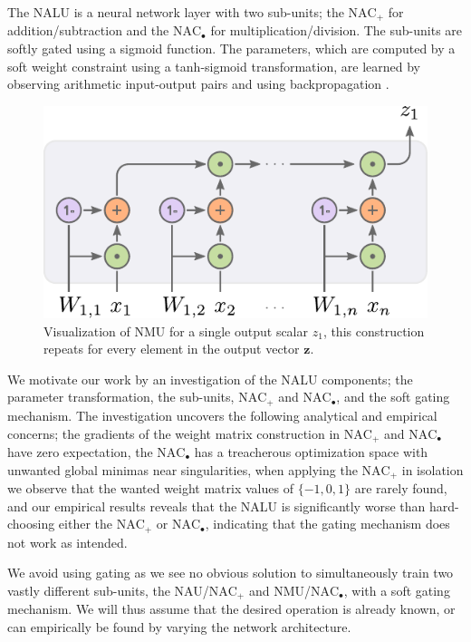 The NALU is a neural network layer with two sub-units; the $\text{NAC}_{+}$ for addition/subtraction and the $\text{NAC}_{\bullet}$ for multiplication/division.
The sub-units are softly gated using a sigmoid function. The parameters, which are computed by a soft weight constraint using a tanh-sigmoid transformation, are learned by observing arithmetic input-output pairs and using backpropagation \cite{rumelhart1986learning}.
\begin{figure}[h]
\centering
\includegraphics[scale=0.6]{graphics/nmu.pdf}
\caption{Visualization of NMU for a single output scalar $z_1$, this construction repeats for every element in the output vector $\mathbf{z}$.}
\end{figure}
We motivate our work by an investigation of the NALU components; the parameter transformation, the sub-units, $\text{NAC}_{+}$ and $\text{NAC}_{\bullet}$, and the soft gating mechanism.
The investigation uncovers the following analytical and empirical concerns; the gradients of the weight matrix construction in $\text{NAC}_{+}$ and $\text{NAC}_{\bullet}$ have zero expectation, the $\text{NAC}_{\bullet}$ has a treacherous optimization space with unwanted global minimas near singularities, when applying the $\text{NAC}_{+}$ in isolation we observe that the wanted weight matrix values of $\{-1, 0, 1\}$ are rarely found, and our empirical results reveals that the NALU is significantly worse than hard-choosing either the $\text{NAC}_{+}$ or $\text{NAC}_{\bullet}$, indicating that the gating mechanism does not work as intended.

We avoid using gating as we see no obvious solution to simultaneously train two vastly different sub-units, the NAU/$\text{NAC}_{+}$ and NMU/$\text{NAC}_{\bullet}$, with a soft gating mechanism.
We will thus assume that the desired operation is already known, or can empirically be found by varying the network architecture.

